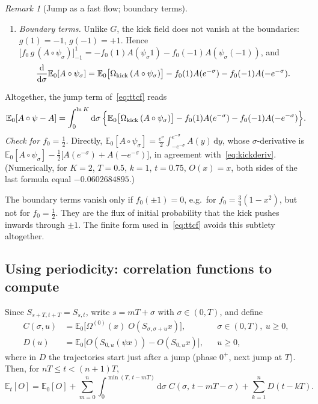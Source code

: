 \documentclass[11pt,a4paper]{article}
\theoremstyle{remark}
\newtheorem{remark}{Remark}
\newcommand{\E}{\mathbb{E}}
\newcommand{\dd}{\mathrm{d}}
\begin{document}
\begin{remark}[Jump as a fast flow; boundary terms]
\begin{enumerate}
\begin{equation}
  \end{equation}
  which has exactly the form of $\Omega^{(0)}=-\Lambda-Gf_0'/f_0$. For
  $f_0=\frac12$, $\Omega_{\rm kick}=1$: the kick contracts phase space at
  unit rate.
\item \emph{Boundary terms.} Unlike $G$, the kick field does not vanish at
  the boundaries: $g(1)=-1$, $g(-1)=+1$. Hence
  $\big[f_0\,g\,(A\circ\psi_\sigma)\big]_{-1}^{1}
  =-f_0(1)A(\psi_\sigma 1)-f_0(-1)A(\psi_\sigma(-1))$, and
  \begin{equation}\label{eq:kickderiv}
    \frac{\dd}{\dd\sigma}\E_0[A\circ\psi_\sigma]
    = \E_0\big[\Omega_{\rm kick}\,(A\circ\psi_\sigma)\big]
    - f_0(1)A(e^{-\sigma}) - f_0(-1)A(-e^{-\sigma}) .
  \end{equation}
\end{enumerate}
Altogether, the jump term of~\eqref{eq:ttcf} reads
\begin{equation}
  \E_0[A\circ\psi - A]
  = \int_0^{\ln K}\dd\sigma\,\Big\{
    \E_0\big[\Omega_{\rm kick}\,(A\circ\psi_\sigma)\big]
    - f_0(1)A(e^{-\sigma}) - f_0(-1)A(-e^{-\sigma})\Big\}.
\end{equation}
\emph{Check for $f_0=\frac12$.} Directly,
$\E_0[A\circ\psi_\sigma]=\frac{e^{\sigma}}{2}\int_{-e^{-\sigma}}^{e^{-\sigma}}A(y)\,\dd y$,
whose $\sigma$-derivative is
$\E_0[A\circ\psi_\sigma]-\frac12\big[A(e^{-\sigma})+A(-e^{-\sigma})\big]$,
in agreement with~\eqref{eq:kickderiv}. (Numerically, for $K=2$, $T=0.5$,
$k=1$, $t=0.75$, $O(x)=x$, both sides of the last formula equal
$-0.0602684895$.)

The boundary terms vanish only if $f_0(\pm1)=0$, e.g.\ for
$f_0=\frac34(1-x^2)$, but not for $f_0=\frac12$. They are the flux of initial
probability that the kick pushes inwards through $\pm1$. The finite form used
in~\eqref{eq:ttcf} avoids this subtlety altogether.
\end{remark}

\subsection{Using periodicity: correlation functions to compute}
Since $S_{s+T,t+T}=S_{s,t}$, write $s=mT+\sigma$ with $\sigma\in(0,T)$, and
define
\begin{align}
  C(\sigma,u) &= \E_0\big[\Omega^{(0)}(x)\;O(S_{\sigma,\sigma+u}x)\big],
  && \sigma\in(0,T),\ u\ge0, \label{eq:C}\\
  D(u) &= \E_0\big[O(S_{0,u}(\psi x)) - O(S_{0,u}x)\big], && u\ge0,
  \label{eq:D}
\end{align}
where in $D$ the trajectories start just after a jump (phase $0^+$, next jump
at $T$). Then, for $nT\le t<(n+1)T$,
\begin{equation}\label{eq:ttcf-periodic}
  \E_t[O] = \E_0[O]
  + \sum_{m=0}^{n}\int_0^{\min(T,\,t-mT)}\!\!\dd\sigma\;
      C(\sigma,\,t-mT-\sigma)
  + \sum_{k=1}^{n} D(t-kT).
\end{equation}
\end{document}
